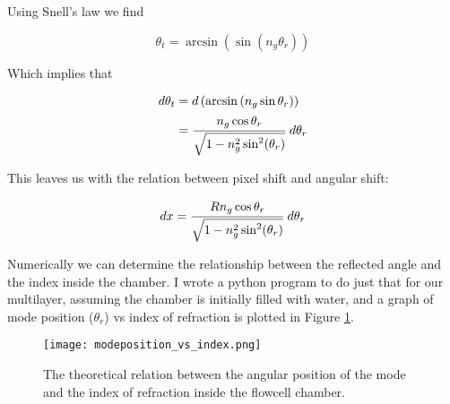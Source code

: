 Using Snell's law we find

\begin{equation*}
	\theta_t = \arcsin(\sin(n_g \theta_r))
\end{equation*}

Which implies that

\begin{equation*}
\begin{split}
	d\theta_t & = d\left(\arcsin\left(n_g \sin{\theta_r}\right)\right) \\
			  & = \cfrac{n_g \cos{\theta_r}}{\sqrt{1-n_g^2 \sin^{2}(\theta_r)}}\,\,d\theta_r
\end{split}
\end{equation*}

This leaves us with the relation between pixel shift and angular shift:

\begin{equation}
	dx = \cfrac{R n_g \cos{\theta_r}}{\sqrt{1-n_g^2 \sin^{2}(\theta_r)}} \,\,d\theta_r
\end{equation}

Numerically we can determine the relationship between the reflected angle and the index inside the chamber. I wrote a python program to do just that for our multilayer, assuming the chamber is initially filled with water, and a graph of mode position ($\theta_r$) vs index of refraction is plotted in Figure \ref{fig:modevsindex}.

\begin{figure}[h]
\begin{center}
\texttt{[image: modeposition\_vs\_index.png]}
\caption{The theoretical relation between the angular position of the mode and the index of refraction inside the flowcell chamber. }
\label{fig:modevsindex}
\end{center}
\end{figure}